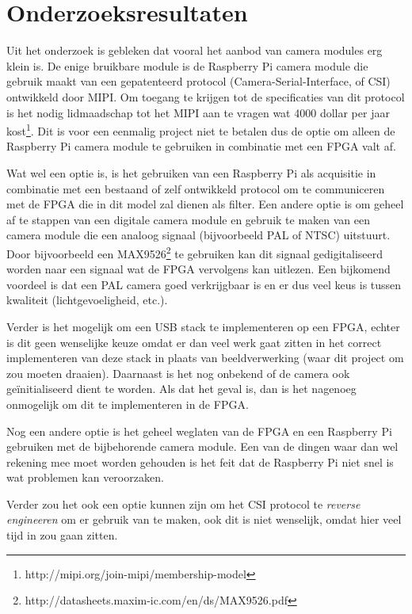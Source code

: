 \chapter{Onderzoeksresultaten}

Uit het onderzoek is gebleken dat vooral het aanbod van camera modules erg klein
is. De enige bruikbare module is de Raspberry Pi camera module die gebruik maakt
van een gepatenteerd protocol (Camera-Serial-Interface, of CSI) ontwikkeld door
MIPI. Om toegang te krijgen tot de specificaties van dit protocol is het nodig
lidmaadschap tot het MIPI aan te vragen wat 4000 dollar per jaar
kost\footnote{http://mipi.org/join-mipi/membership-model}. Dit is voor een
eenmalig project niet te betalen dus de optie om alleen de Raspberry Pi camera
module te gebruiken in combinatie met een FPGA valt af.

Wat wel een optie is, is het gebruiken van een Raspberry Pi als acquisitie in
combinatie met een bestaand of zelf ontwikkeld protocol om te communiceren met
de FPGA die in dit model zal dienen als filter. Een andere optie is om geheel
af te stappen van een digitale camera module en gebruik te maken van een camera
module die een analoog signaal (bijvoorbeeld PAL of NTSC) uitstuurt. Door
bijvoorbeeld een MAX9526\footnote{http://datasheets.maxim-ic.com/en/ds/MAX9526.pdf}
te gebruiken kan dit signaal gedigitaliseerd worden naar een signaal wat de FPGA
vervolgens kan uitlezen. Een bijkomend voordeel is dat een PAL camera goed 
verkrijgbaar is en er dus veel keus is tussen kwaliteit (lichtgevoeligheid, etc.).

Verder is het mogelijk om een USB stack te implementeren op een FPGA, echter is
dit geen wenselijke keuze omdat er dan veel werk gaat zitten in het correct
implementeren van deze stack in plaats van beeldverwerking (waar dit project om
zou moeten draaien). Daarnaast is het nog onbekend of de camera ook 
geïnitialiseerd dient te worden. Als dat het geval is, dan is het nagenoeg 
onmogelijk om dit te implementeren in de FPGA.

Nog een andere optie is het geheel weglaten van de FPGA en een Raspberry Pi
gebruiken met de bijbehorende camera module. Een van de dingen waar dan wel
rekening mee moet worden gehouden is het feit dat de Raspberry Pi niet snel is
wat problemen kan veroorzaken.

Verder zou het ook een optie kunnen zijn om het CSI protocol te \emph{reverse
engineeren} om er gebruik van te maken, ook dit is niet wenselijk, omdat hier
veel tijd in zou gaan zitten.
